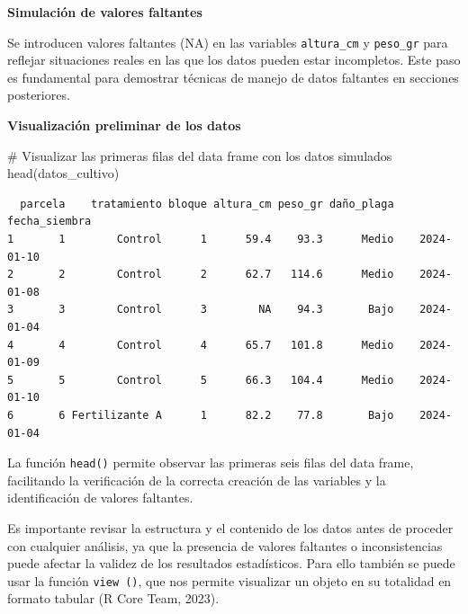 \documentclass[
  spanish,
  a4paper,
  DIV=11,
  numbers=noendperiod,
  onepage,
  openany]{scrreprt}
\newenvironment{Shaded}{\begin{snugshade}}{\end{snugshade}}
\newcommand{\CommentTok}[1]{\textcolor[rgb]{0.37,0.37,0.37}{#1}}
\newcommand{\ConstantTok}[1]{\textcolor[rgb]{0.56,0.35,0.01}{#1}}
\newcommand{\DecValTok}[1]{\textcolor[rgb]{0.68,0.00,0.00}{#1}}
\newcommand{\FunctionTok}[1]{\textcolor[rgb]{0.28,0.35,0.67}{#1}}
\newcommand{\NormalTok}[1]{\textcolor[rgb]{0.00,0.23,0.31}{#1}}
\newcommand{\OtherTok}[1]{\textcolor[rgb]{0.00,0.23,0.31}{#1}}
\newcommand{\SpecialCharTok}[1]{\textcolor[rgb]{0.37,0.37,0.37}{#1}}
\begin{document}
\textbf{Simulación de valores faltantes}

\begin{Shaded}
\end{Shaded}

Se introducen valores faltantes (NA) en las variables
\texttt{altura\_cm} y \texttt{peso\_gr} para reflejar situaciones reales
en las que los datos pueden estar incompletos. Este paso es fundamental
para demostrar técnicas de manejo de datos faltantes en secciones
posteriores.

\textbf{Visualización preliminar de los datos}

\begin{Shaded}
\begin{Highlighting}[]
\CommentTok{\# Visualizar las primeras filas del data frame con los datos simulados}
\FunctionTok{head}\NormalTok{(datos\_cultivo)}
\end{Highlighting}
\end{Shaded}

\begin{verbatim}
  parcela    tratamiento bloque altura_cm peso_gr daño_plaga fecha_siembra
1       1        Control      1      59.4    93.3      Medio    2024-01-10
2       2        Control      2      62.7   114.6      Medio    2024-01-08
3       3        Control      3        NA    94.3       Bajo    2024-01-04
4       4        Control      4      65.7   101.8      Medio    2024-01-09
5       5        Control      5      66.3   104.4      Medio    2024-01-10
6       6 Fertilizante A      1      82.2    77.8       Bajo    2024-01-04
\end{verbatim}

La función \texttt{head()} permite observar las primeras seis filas del
data frame, facilitando la verificación de la correcta creación de las
variables y la identificación de valores faltantes.

Es importante revisar la estructura y el contenido de los datos antes de
proceder con cualquier análisis, ya que la presencia de valores
faltantes o inconsistencias puede afectar la validez de los resultados
estadísticos. Para ello también se puede usar la función
\texttt{view\ ()}, que nos permite visualizar un objeto en su totalidad
en formato tabular (R Core Team, 2023).
\end{document}
